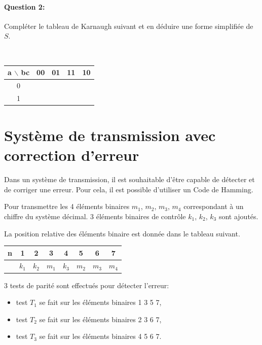 \paragraph{Question 2:} Compléter le tableau de Karnaugh suivant et en déduire une forme simplifiée de $S$.

~\

\begin{center}
\begin{tabular}{|c|c|c|c|c|}
\hline
a $\backslash$ bc & 00 & 01 & 11 & 10 \\
\hline
0  &    &    &    &    \\
\hline
1  &    &    &    & \\
\hline
\end{tabular} 
\end{center}

\section{Système de transmission avec correction d'erreur}

Dans un système de transmission, il est souhaitable d'être capable de détecter et de corriger une erreur. Pour cela, il est possible d'utiliser un \og Code de Hamming\fg.

Pour transmettre les 4 éléments binaires $m_1$, $m_2$, $m_3$, $m_4$ correspondant à un chiffre du système décimal. 3 éléments binaires de contrôle $k_1$, $k_2$, $k_3$ sont ajoutés.

La position relative des éléments binaire est donnée dans le tableau suivant.

\begin{center}
\begin{tabular}{|c|c|c|c|c|c|c|c|}
\hline
n & 1 & 2 & 3 & 4 & 5 & 6 & 7 \\
\hline
  & $k_1$ & $k_2$ & $m_1$ & $k_3$ & $m_2$ & $m_3$ & $m_4$ \\
\hline
\end{tabular} 
\end{center}

3 tests de parité sont effectués pour détecter l'erreur:
\begin{itemize}
 \item test $T_1$ se fait sur les éléments binaires 1 3 5 7,
 \item test $T_2$ se fait sur les éléments binaires 2 3 6 7,
 \item test $T_3$ se fait sur les éléments binaires 4 5 6 7.
\end{itemize}

